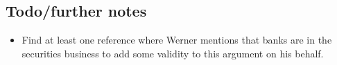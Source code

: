 \subsection{Todo/further notes}
\begin{itemize}
    \item Find at least one reference where Werner mentions that banks are in the securities business to add some validity to this argument on his behalf.
\end{itemize}